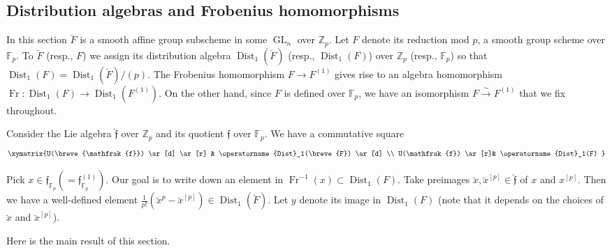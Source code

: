 \documentclass{amsart}
\theoremstyle{definition}
\newcommand{\F}{\mathbb{F}}
\newcommand{\Z}{\mathbb{Z}}
\newcommand{\ff}{\mathfrak{f}}
\numberwithin{equation}{section}
\begin{document}
\subsection{Distribution algebras and Frobenius homomorphisms}
In this section $\breve{F}$ is a smooth affine  group subscheme in some $\operatorname{GL}_n$ over $\mathbb{Z}_p$. Let $F$ denote its reduction mod $p$, a smooth group scheme over $\F_p$. To $\breve{F}$ (resp., $F$) we assign its distribution algebra $\operatorname{Dist}_1(\breve{F})$ (resp., $\operatorname{Dist}_1(F)$) over $\mathbb{Z}_p$ (resp., $\F_p$) so that $\operatorname{Dist}_1(F)=\operatorname{Dist}_1(\breve{F})/(p)$. The Frobenius homomorphism $F\rightarrow F^{(1)}$ gives rise to an algebra homomorphism $\operatorname{Fr}:\operatorname{Dist}_1(F)\rightarrow \operatorname{Dist}_1(F^{(1)})$. On the other hand, since $F$ is defined over $\F_p$, we have an isomorphism $F\xrightarrow{\sim}F^{(1)}$ that we fix throughout. 

Consider the Lie algebra $\breve{\ff}$ over $\Z_p$
and its quotient $\ff$ over $\F_p$. We have a commutative square
$$\xymatrix{U(\breve{\ff}) \ar[d] \ar[r] & \operatorname{Dist}_1(\breve{F}) \ar[d] \\ U(\ff) \ar[r]&  \operatorname{Dist}_1(F) }$$

Pick $x\in \ff_{\F_p}(=\ff_{\F_p}^{(1)})$. Our goal is to write down an element in $\operatorname{Fr}^{-1}(x)\subset  \operatorname{Dist}_1(F)$. Take  preimages $\breve{x},\breve{x}^{[p]}\in \breve{\ff}$ of $x$ and $x^{[p]}$. Then we have a well-defined element $\frac{1}{p!}(\breve{x}^p-\breve{x}^{[p]})\in \operatorname{Dist}_1(\breve{F})$. Let $y$ denote its image in $\operatorname{Dist}_1(F)$ (note that it depends on the choices of $\breve{x}$ and $\breve{x}^{[p]}$). 

Here is the main result of this section. 
\end{document}
